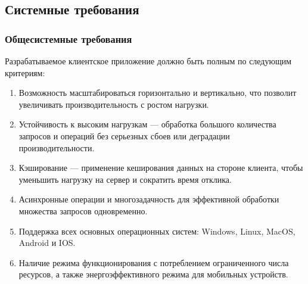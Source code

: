 \documentclass[a4paper,14pt]{extarticle}
\begin{document}
\begin{spacing}{1.5}
\clearpage

\subsection{Системные требования}

\subsubsection{Общесистемные требования}
\hspace{\parindent} Разрабатываемое клиентское приложение должно быть полным по следующим критериям:
\begin{enumerate}[label*=\arabic*.]
    \item Возможность масштабироваться горизонтально и вертикально, что позволит увеличивать производительность с ростом нагрузки.
    \item Устойчивость к высоким нагрузкам --- обработка большого количества запросов и операций без серьезных сбоев или деградации производительности.
    \item Кэширование --- применение кеширования данных на стороне клиента, чтобы уменьшить нагрузку на сервер и сократить время отклика.
    \item Асинхронные операции и многозадачность для эффективной обработки множества запросов одновременно.
    \item Поддержка всех основных операционных систем: Windows, Linux, MacOS, Android и IOS.
    \item Наличие режима функционирования с потреблением ограниченного числа ресурсов, а также энергоэффективного режима для мобильных устройств.
\end{enumerate}


\end{spacing}
\end{document}
